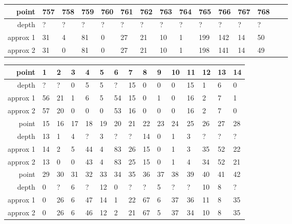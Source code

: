 \begin{center}
\begin{supertabular}{|r|l l l l l l l l l l l l l l|}
\hline
point & 757 & 758 & 759 & 760 & 761 & 762 & 763 & 764 & 765 & 766 & 767 & 768 & & \\
\hline
depth & ? & ? & ? & ? & ? & ? & ? & ? & ? & ? & ? & ? & & \\
approx 1 & 31 & 4 & 81 & 0 & 27 & 21 & 10 & 1 & 199 & 142 & 14 & 50 & & \\
approx 2 & 31 & 0 & 81 & 0 & 27 & 21 & 10 & 1 & 198 & 141 & 14 & 49 & & \\
\hline
  \end{supertabular}
  \label{tab:test.pima4d}
\end{center}

\begin{center}
  \tablefirsthead{\hline}
  \tablelasttail{\hline}
  \begin{supertabular}{|r|l l l l l l l l l l l l l l|}
\hline
point & 1 & 2 & 3 & 4 & 5 & 6 & 7 & 8 & 9 & 10 & 11 & 12 & 13 & 14 \\
\hline
depth & ? & ? & 0 & 5 & 5 & ? & 15 & 0 & 0 & 0 & 15 & 1 & 6 & 0 \\
approx 1 & 56 & 21 & 1 & 6 & 5 & 54 & 15 & 0 & 1 & 0 & 16 & 2 & 7 & 1 \\
approx 2 & 57 & 20 & 0 & 0 & 0 & 53 & 16 & 0 & 0 & 0 & 16 & 2 & 7 & 0 \\
\hline
point & 15 & 16 & 17 & 18 & 19 & 20 & 21 & 22 & 23 & 24 & 25 & 26 & 27 & 28 \\
\hline
depth & 13 & 1 & 4 & ? & 3 & ? & ? & 14 & 0 & 1 & 3 & ? & ? & ? \\
approx 1 & 14 & 2 & 5 & 44 & 4 & 83 & 26 & 15 & 0 & 1 & 3 & 35 & 52 & 22 \\
approx 2 & 13 & 0 & 0 & 43 & 4 & 83 & 25 & 15 & 0 & 1 & 4 & 34 & 52 & 21 \\
\hline
point & 29 & 30 & 31 & 32 & 33 & 34 & 35 & 36 & 37 & 38 & 39 & 40 & 41 & 42 \\
\hline
depth & 0 & ? & 6 & ? & 12 & 0 & ? & ? & 5 & ? & ? & 10 & 8 & ? \\
approx 1 & 0 & 26 & 6 & 47 & 14 & 1 & 22 & 67 & 6 & 37 & 36 & 11 & 8 & 35 \\
approx 2 & 0 & 26 & 6 & 46 & 12 & 2 & 21 & 67 & 5 & 37 & 34 & 10 & 8 & 35 \\

\end{supertabular}
\end{center}
